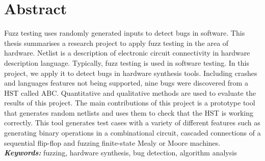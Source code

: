 \renewcommand{\baselinestretch}{1.5}
\chapter{Abstract}
\renewcommand{\baselinestretch}{\mystretch}
\providecommand{\keywords}[1]
{
  \small	
  \textbf{\textit{Keywords:}} #1
}
Fuzz testing uses randomly generated inputs to detect bugs in software. This thesis summarises a research project to apply fuzz testing in the area of hardware. Netlist is a description of electronic circuit connectivity in hardware description language. Typically, fuzz testing is used in software testing. In this project, we apply it to detect bugs in hardware synthesis tools. Including crashes and languages features not being supported, nine bugs were discovered from a HST called ABC. Quantitative and qualitative methods are used to evaluate the results of this project. The main contributions of this project is a prototype tool that generates random netlists and uses them to check that the HST is working correctly. This tool generates test cases with a variety of different features such as generating binary operations in a combinational circuit, cascaded connections of a sequential flip-flop and fuzzing finite-state Mealy or Moore machines.\\
\keywords{fuzzing, hardware synthesis, bug detection, algorithm analysis}